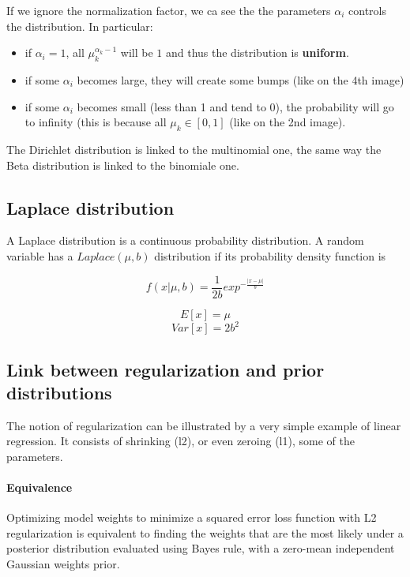 If we ignore the normalization factor, we ca see the the parameters $\alpha_i$ controls the distribution. In particular:
\begin{itemize}
    \item if $\alpha_i = 1$, all $\mu_k^{\alpha_k-1}$ will be $1$ and thus the distribution is \textbf{uniform}.
    \item if some $\alpha_i$ becomes large, they will create some bumps (like on the 4th image)
    \item if some $\alpha_i$ becomes small (less than 1 and tend to 0), the probability will go to infinity (this is because all $\mu_k \in [0, 1]$ (like on the 2nd image).
\end{itemize}


The Dirichlet distribution is linked to the multinomial one, the same way the Beta distribution is linked to the binomiale one.

\subsection{Laplace distribution}
A Laplace distribution is a continuous probability distribution.
A random variable has a $Laplace(\mu, b)$ distribution if its probability density function is

\begin{equation}
    f(x|\mu, b) = \frac{1}{2b}exp^{-\frac{|x-\mu|}{b}}
\end{equation}

\begin{equation}
    E[x] = \mu
\end{equation}
\begin{equation}
    Var[x] = 2b^2
\end{equation}

\subsection{Link between regularization and prior distributions}
The notion of regularization can be illustrated by a very simple example of linear regression. It consists of shrinking (l2), or even zeroing (l1), some of the parameters.

\paragraph{Equivalence}
Optimizing model weights to minimize a squared error loss function with L2 regularization is equivalent to finding the weights that are the most likely under a posterior distribution evaluated using Bayes rule, with a zero-mean independent Gaussian weights prior.

